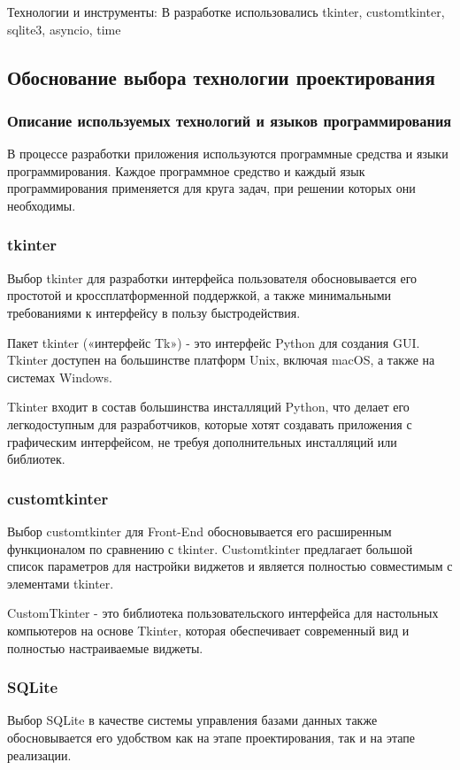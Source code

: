 Технологии и инструменты: В разработке использовались tkinter, customtkinter, sqlite3, asyncio, time

\subsection{Обоснование выбора технологии проектирования}

\subsubsection{Описание используемых технологий и языков программирования}

В процессе разработки приложения используются программные средства и языки программирования. Каждое программное средство и каждый язык программирования применяется для круга задач, при решении которых они необходимы.

\subsubsection {tkinter}
Выбор tkinter для разработки интерфейса пользователя обосновывается его простотой и кроссплатформенной поддержкой, а также минимальными требованиями к интерфейсу в пользу быстродействия. 

Пакет tkinter («интерфейс Tk») - это интерфейс Python для создания GUI. Tkinter доступен на большинстве платформ Unix, включая macOS, а также на системах Windows.

Tkinter входит в состав большинства инсталляций Python, что делает его легкодоступным для разработчиков, которые хотят создавать приложения с графическим интерфейсом, не требуя дополнительных инсталляций или библиотек.

\subsubsection {customtkinter}
Выбор customtkinter для Front-End обосновывается его расширенным функционалом по сравнению с tkinter. Customtkinter предлагает большой список параметров для настройки виджетов и является полностью совместимым с элементами tkinter.

CustomTkinter - это библиотека пользовательского интерфейса для настольных компьютеров на основе Tkinter, которая обеспечивает современный вид и полностью настраиваемые виджеты.

\subsubsection {SQLite}
Выбор SQLite в качестве системы управления базами данных также обосновывается его удобством как на этапе проектирования, так и на этапе реализации.

